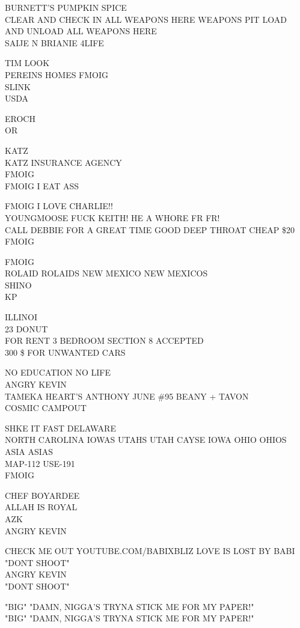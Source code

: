 \documentclass[10pt,letterpaper]{article}
\begin{document}
BURNETT'S PUMPKIN SPICE\\
CLEAR AND CHECK IN ALL WEAPONS HERE WEAPONS PIT LOAD AND UNLOAD ALL WEAPONS HERE\\
SAIJE N BRIANIE 4LIFE

TIM LOOK\\
PEREINS HOMES FMOIG\\
SLINK\\
USDA

EROCH\\
OR

KATZ\\
KATZ INSURANCE AGENCY\\
FMOIG\\
FMOIG I EAT ASS

FMOIG I LOVE CHARLIE!!\\
YOUNGMOOSE FUCK KEITH! HE A WHORE FR FR!\\
CALL DEBBIE FOR A GREAT TIME GOOD DEEP THROAT CHEAP \$20\\
FMOIG

FMOIG\\
ROLAID ROLAIDS NEW MEXICO NEW MEXICOS\\
SHINO\\
KP

ILLINOI\\
23 DONUT\\
FOR RENT 3 BEDROOM SECTION 8 ACCEPTED\\
300 \$ FOR UNWANTED CARS

NO EDUCATION NO LIFE\\
ANGRY KEVIN\\
TAMEKA HEART'S ANTHONY JUNE \#95 BEANY + TAVON\\
COSMIC CAMPOUT

SHKE IT FAST DELAWARE\\
NORTH CAROLINA IOWAS UTAHS UTAH CAYSE IOWA OHIO OHIOS ASIA ASIAS\\
MAP{-}112 USE{-}191\\
FMOIG

CHEF BOYARDEE\\
ALLAH IS ROYAL\\
AZK\\
ANGRY KEVIN

CHECK ME OUT YOUTUBE.COM/BABIXBLIZ LOVE IS LOST BY BABI "DONT SHOOT"\\
ANGRY KEVIN\\
"DONT SHOOT"

"BIG" "DAMN, NIGGA'S TRYNA STICK ME FOR MY PAPER!"\\
"BIG" "DAMN, NIGGA'S TRYNA STICK ME FOR MY PAPER!"
\end{document}
